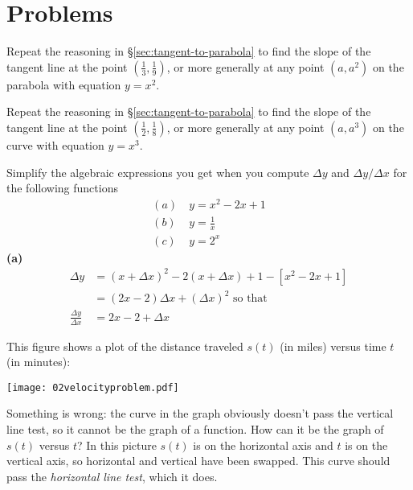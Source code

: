 \section{Problems} 
\problemfont%
\begin{multicols}{2}\setlength{\parindent}{0pt}
\problem \label{ex:02derivATonethird} 
Repeat the reasoning in \S\ref{sec:tangent-to-parabola} to find the slope of the
tangent line at the point $(\frac13, \frac19)$, or more generally at any point
$(a, a^2)$ on the parabola with equation $y=x^2$.

\problem Repeat the reasoning in \S\ref{sec:tangent-to-parabola} to find the 
slope of the tangent line at the point $(\frac12, \frac18)$, or more generally
at any point $(a, a^3)$ on the curve with equation $y=x^3$.

\problem Simplify the algebraic expressions you get when you compute $\Delta y$ and 
$\Delta y/\Delta x$ for the following functions
\begin{align*}
  (a)~& y = x^2-2x+1 \\
  (b)~& y = \frac1x \\
  (c)~& y = 2^x
  \end{align*}
\answer 
\textbf{(a)}
\begin{align*}
  \Delta y &= (x+\Delta x)^2  -2 (x+\Delta x)+1 - [x^2-2x+1]\\
  &=(2x-2)\Delta x +(\Delta x)^2 \text{ so that}\\
  \frac{\Delta y}{\Delta x}&= 2x-2 + \Delta x
\end{align*}
\endanswer

\problem This figure shows a plot of the distance traveled $s(t)$ (in miles)
versus time $t$ (in minutes):
\smallskip

\centerline{\texttt{[image: 02velocityproblem.pdf]}}

\subprob Something is wrong:  the curve in the graph obviously doesn't pass the vertical
line test, so it cannot be the graph of a function.  How can it be the graph of $s(t)$
versus $t$?
\answer 
In this picture $s(t)$ is on the horizontal axis and $t$ is on the vertical axis, so
horizontal and vertical have been swapped. This curve should pass the \emph{horizontal
line test}, which it does.
\endanswer


\end{multicols}
